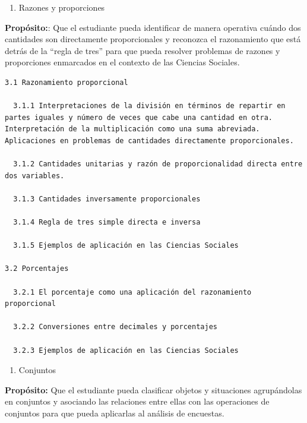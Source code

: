 \documentclass[]{book}
\providecommand{\tightlist}{%
  \setlength{\itemsep}{0pt}\setlength{\parskip}{0pt}}
\begin{document}
\begin{enumerate}
\def\labelenumi{\arabic{enumi}.}
\setcounter{enumi}{2}
\tightlist
\item
  Razones y proporciones
\end{enumerate}

\textbf{Propósito:}: Que el estudiante pueda identificar de manera
operativa cuándo dos cantidades son directamente proporcionales y
reconozca el razonamiento que está detrás de la ``regla de tres'' para
que pueda resolver problemas de razones y proporciones enmarcados en el
contexto de las Ciencias Sociales.

\begin{verbatim}
3.1 Razonamiento proporcional

  3.1.1 Interpretaciones de la división en términos de repartir en partes iguales y número de veces que cabe una cantidad en otra. Interpretación de la multiplicación como una suma abreviada. Aplicaciones en problemas de cantidades directamente proporcionales.

  3.1.2 Cantidades unitarias y razón de proporcionalidad directa entre dos variables.

  3.1.3 Cantidades inversamente proporcionales

  3.1.4 Regla de tres simple directa e inversa

  3.1.5 Ejemplos de aplicación en las Ciencias Sociales

3.2 Porcentajes

  3.2.1 El porcentaje como una aplicación del razonamiento proporcional

  3.2.2 Conversiones entre decimales y porcentajes

  3.2.3 Ejemplos de aplicación en las Ciencias Sociales
\end{verbatim}

\begin{enumerate}
\def\labelenumi{\arabic{enumi}.}
\setcounter{enumi}{3}
\tightlist
\item
  Conjuntos
\end{enumerate}

\textbf{Propósito:} Que el estudiante pueda clasificar objetos y
situaciones agrupándolas en conjuntos y asociando las relaciones entre
ellas con las operaciones de conjuntos para que pueda aplicarlas al
análisis de encuestas.
\end{document}
